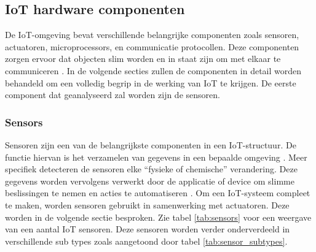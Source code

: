 



\subsection{IoT hardware componenten} 
De IoT-omgeving bevat verschillende belangrijke componenten zoals sensoren, actuatoren, microprocessors, en communicatie protocollen. Deze componenten zorgen ervoor dat objecten slim worden en in staat zijn om met elkaar te communiceren \autocite{Abraham2023, Gharde2024}. In de volgende secties zullen de componenten in detail worden behandeld om een volledig begrip in de werking van IoT te krijgen. De eerste component dat geanalyseerd zal worden zijn de sensoren.

\subsubsection{Sensors}
Sensoren zijn een van de belangrijkste componenten in een IoT-structuur. De functie hiervan is het verzamelen van gegevens in een bepaalde omgeving \autocite{Abraham2023, Moyer2019}. Meer specifiek detecteren de sensoren elke “fysieke of chemische” verandering. Deze gegevens worden vervolgens verwerkt door de applicatie of device om slimme beslissingen te nemen en acties te automatiseren \autocite{Sehrawat2019}. Om een IoT-systeem compleet te maken, worden sensoren gebruikt in samenwerking met actuatoren. Deze worden in de volgende sectie besproken. Zie tabel \ref{tab:sensors} voor een weergave van een aantal IoT sensoren. Deze sensoren worden verder onderverdeeld in verschillende sub types zoals aangetoond door tabel \ref{tab:sensor_subtypes}.

